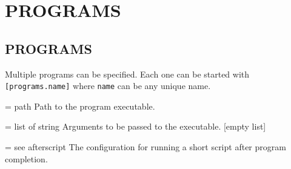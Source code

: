 \documentclass[a4paper,english]{article}
\begin{document}
    \section*{PROGRAMS}
    \begin{adjustwidth}{18pt}{0pt}
    \section{PROGRAMS}

      Multiple programs can be specified. Each one can be started with \texttt{[programs.name]} where \texttt{name} can be any unique name.

      \begin{Description}[Options]\setlength{\itemsep}{0cm}
          \item[\Opt{binary} = path] Path to the program executable.
          \item[\oOpt{arguments} = list of string] Arguments to be passed to the executable. [empty list]
          \item[\oOpt{afterscript} = see afterscript] The configuration for running a short script after program completion.
      \end{Description}

    \end{adjustwidth}
\end{document}
